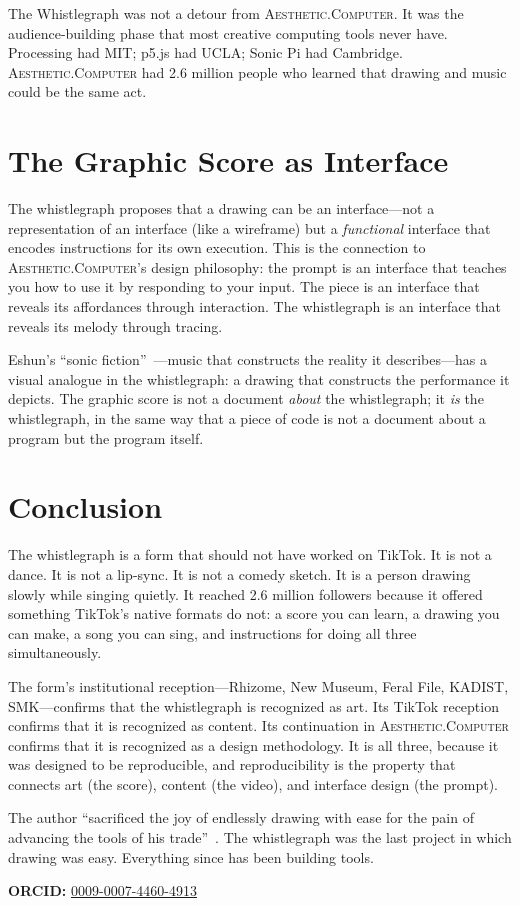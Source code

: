 \documentclass[10pt,letterpaper,twocolumn]{article}
\newcommand{\ac}{\textsc{Aesthetic.Computer}}
\begin{document}
The Whistlegraph was not a detour from \ac{}. It was the audience-building phase that most creative computing tools never have. Processing had MIT; p5.js had UCLA; Sonic Pi had Cambridge. \ac{} had 2.6 million people who learned that drawing and music could be the same act.

\section{The Graphic Score as Interface}

The whistlegraph proposes that a drawing can be an interface---not a representation of an interface (like a wireframe) but a \emph{functional} interface that encodes instructions for its own execution. This is the connection to \ac{}'s design philosophy: the prompt is an interface that teaches you how to use it by responding to your input. The piece is an interface that reveals its affordances through interaction. The whistlegraph is an interface that reveals its melody through tracing.

Eshun's ``sonic fiction''~\citep{eshun1998more}---music that constructs the reality it describes---has a visual analogue in the whistlegraph: a drawing that constructs the performance it depicts. The graphic score is not a document \emph{about} the whistlegraph; it \emph{is} the whistlegraph, in the same way that a piece of code is not a document about a program but the program itself.

\section{Conclusion}

The whistlegraph is a form that should not have worked on TikTok. It is not a dance. It is not a lip-sync. It is not a comedy sketch. It is a person drawing slowly while singing quietly. It reached 2.6 million followers because it offered something TikTok's native formats do not: a score you can learn, a drawing you can make, a song you can sing, and instructions for doing all three simultaneously.

The form's institutional reception---Rhizome, New Museum, Feral File, KADIST, SMK---confirms that the whistlegraph is recognized as art. Its TikTok reception confirms that it is recognized as content. Its continuation in \ac{} confirms that it is recognized as a design methodology. It is all three, because it was designed to be reproducible, and reproducibility is the property that connects art (the score), content (the video), and interface design (the prompt).

The author ``sacrificed the joy of endlessly drawing with ease for the pain of advancing the tools of his trade''~\citep{scudder2019drawing}. The whistlegraph was the last project in which drawing was easy. Everything since has been building tools.

\vspace{0.5em}
\noindent\textbf{ORCID:} \href{https://orcid.org/0009-0007-4460-4913}{0009-0007-4460-4913}



\end{document}
